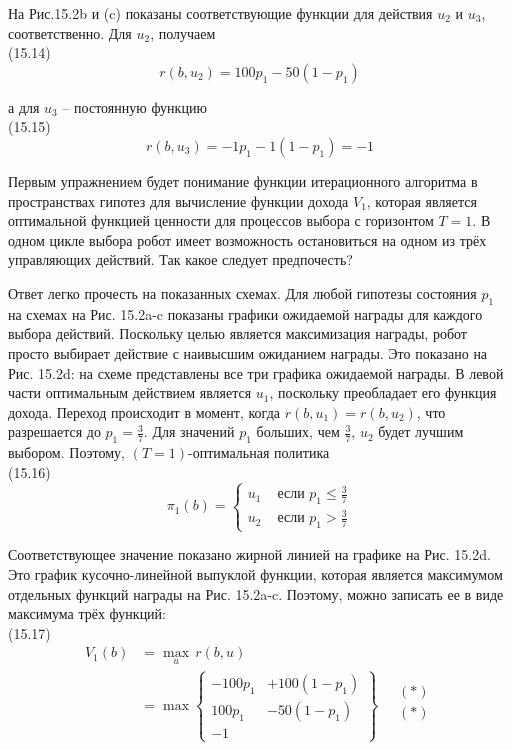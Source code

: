 \documentclass[10pt,a4paper]{article}
\begin{document}
На Рис.15.2b и (c) показаны соответствующие функции для действия $u_2$ и $u_3$, соответственно. Для $u_2$, получаем \\

(15.14)
$$r(b,u_2)=100p_1-50(1-p_1)$$

а для $u_3$ – постоянную функцию\\

(15.15)
$$r(b,u_3)=-1p_1-1(1-p_1)=-1$$

Первым упражнением будет понимание функции итерационного алгоритма в пространствах гипотез для вычисление функции дохода $V_1$, которая является оптимальной функцией ценности для процессов выбора с горизонтом $T = 1$. В одном цикле выбора робот имеет возможность остановиться на одном из трёх управляющих действий. Так какое следует предпочесть?

Ответ легко прочесть на показанных схемах. Для любой гипотезы состояния $p_1$ на схемах на Рис. 15.2a-c показаны графики ожидаемой награды для каждого выбора действий. Поскольку целью является максимизация награды, робот просто выбирает действие с наивысшим ожиданием награды. Это показано на Рис. 15.2d: на схеме представлены все три графика ожидаемой награды. В левой части оптимальным действием является $u_1$, поскольку преобладает его функция дохода. Переход происходит в момент, когда $r(b, u_1) = r(b, u_2)$, что разрешается до $p_1 = \frac{3}{7}$. Для значений $p_1$ больших, чем $\frac{3}{7}$, $u_2$ будет лучшим выбором. Поэтому, $(T = 1)$-оптимальная политика\\

(15.16)
\begin{equation*}
\pi_1(b)= \left\{
\begin{array}{ll}
u_1& \mbox{ если } p_1 \leq \frac{3}{7} \\
u_2& \mbox{ если } p_1 > \frac{3}{7} 
\end{array}
\right.
\end{equation*}

Соответствующее значение показано жирной линией на графике на Рис. 15.2d. Это график кусочно-линейной выпуклой функции, которая является максимумом отдельных функций награды на Рис. 15.2a-c. Поэтому, можно записать ее в виде максимума трёх функций:\\

(15.17)
\begin{equation*}
\begin{split}
V_1(b)&=\underset{u}{\max}\,r(b,u)\\
&=\max\left\{
\begin{array}{rr}
-100p_1&+100(1-p_1)\\
100p_1&-50(1-p_1)\\
-1&{} 
\end{array}
\right\}\quad
\begin{array}{c}
(\ast)\\(\ast)\\
{}
\end{array}
\end{split}
\end{equation*}
\end{document}
